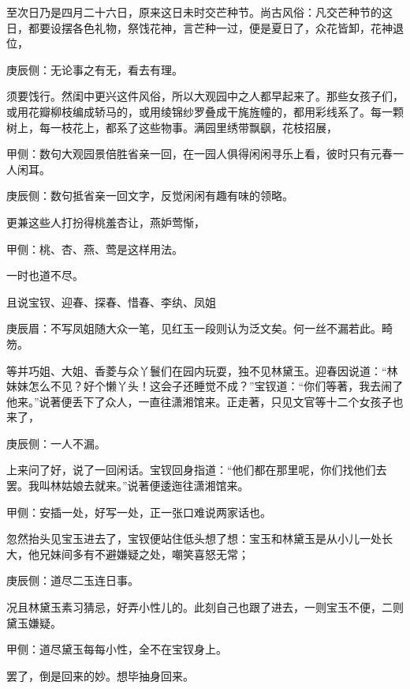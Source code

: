 \begin{parag}
    至次日乃是四月二十六日，原来这日未时交芒种节。尚古风俗：凡交芒种节的这日，都要设摆各色礼物，祭饯花神，言芒种一过，便是夏日了，众花皆卸，花神退位，\begin{note}庚辰侧：无论事之有无，看去有理。\end{note}须要饯行。然闺中更兴这件风俗，所以大观园中之人都早起来了。那些女孩子们，或用花瓣柳枝编成轿马的，或用绫锦纱罗叠成干旄旌幢的，都用彩线系了。每一颗树上，每一枝花上，都系了这些物事。满园里绣带飘飖，花枝招展，\begin{note}甲侧：数句大观园景倍胜省亲一回，在一园人俱得闲闲寻乐上看，彼时只有元春一人闲耳。\end{note}\begin{note}庚辰侧：数句抵省亲一回文字，反觉闲闲有趣有味的领略。\end{note}更兼这些人打扮得桃羞杏让，燕妒莺惭，\begin{note}甲侧：桃、杏、燕、莺是这样用法。\end{note}一时也道不尽。
\end{parag}


\begin{parag}
    且说宝钗、迎春、探春、惜春、李纨、凤姐\begin{note}庚辰眉：不写凤姐随大众一笔，见红玉一段则认为泛文矣。何一丝不漏若此。畸笏。\end{note}等并巧姐、大姐、香菱与众丫鬟们在园内玩耍，独不见林黛玉。迎春因说道：“林妹妹怎么不见？好个懒丫头！这会子还睡觉不成？”宝钗道：“你们等著，我去闹了他来。”说著便丢下了众人，一直往潇湘馆来。正走著，只见文官等十二个女孩子也来了，\begin{note}庚辰侧：一人不漏。\end{note}上来问了好，说了一回闲话。宝钗回身指道：“他们都在那里呢，你们找他们去罢。我叫林姑娘去就来。”说著便逶迤往潇湘馆来。\begin{note}甲侧：安插一处，好写一处，正一张口难说两家话也。\end{note}忽然抬头见宝玉进去了，宝钗便站住低头想了想：宝玉和林黛玉是从小儿一处长大，他兄妹间多有不避嫌疑之处，嘲笑喜怒无常；\begin{note}庚辰侧：道尽二玉连日事。\end{note}况且林黛玉素习猜忌，好弄小性儿的。此刻自己也跟了进去，一则宝玉不便，二则黛玉嫌疑。\begin{note}甲侧：道尽黛玉每每小性，全不在宝钗身上。\end{note}罢了，倒是回来的妙。想毕抽身回来。
\end{parag}


